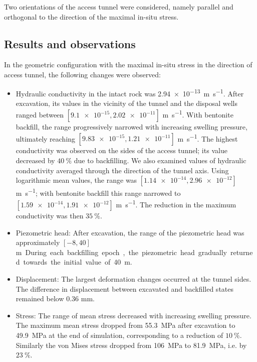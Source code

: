 Two orientations of the access tunnel were considered, namely parallel and orthogonal to the direction of the maximal in-situ stress.

\subsection{Results and observations}


In the geometric configuration with the maximal in-situ stress in the direction of access tunnel, the following changes were observed:
\begin{itemize}
\item Hydraulic conductivity in the intact rock was \SI{2.94e-13}{\meter\per\second}.
After excavation, its values in the vicinity of the tunnel and the disposal wells  ranged between $[\num{9.1e-15}, \num{2.02e-11}]$ \unit{\meter\per\second}.
With bentonite backfill, the range progressively narrowed with increasing swelling pressure, ultimately reaching $[\num{9.83e-15}, \num{1.21e-11}]$ \unit{\meter\per\second}.
The highest conductivity was observed on the sides of the access tunnel; its value decreased by $40~\%$ due to backfilling.
We also examined values of hydraulic conductivity averaged through the direction of the tunnel axis. Using logarithmic mean values, the range was $[\num{1.14e-14}, \num{2.96e-12}]$ \unit{\meter\per\second}; with bentonite backfill this range narrowed to $[\num{1.59e-14}, \num{1.91e-12}]$ \unit{\meter\per\second}. The reduction in the maximum conductivity was then $35~\%$.

\item Piezometric head: After excavation, the range of the piezometric head was approximately $[-8,40]$ \unit\meter. During each backfilling epoch, the piezometric head gradually returned towards the initial value of 40 \unit{\meter}.

\item Displacement: The largest deformation changes occurred at the tunnel sides. The difference in displacement between excavated and backfilled states remained below 0.36 \unit{\milli\meter}.

\item Stress: The range of mean stress decreased with increasing swelling pressure. The maximum mean stress dropped from \SI{55.3}{\MPa} after excavation to \SI{49.9}{\MPa} at the end of simulation, corresponding to a reduction of $10~\%$.
Similarly the von Mises stress dropped from \SI{106}{\MPa} to \SI{81.9}{\MPa}, i.e. by $23~\%$.
\end{itemize}

